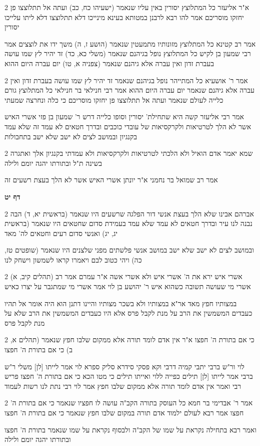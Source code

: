 \documentclass[12pt, openany]{book}
\newcommand{\sethebfont}{
\fontsize{10.5pt}{21.0pt} \selectfont
}
\newcommand{\twocol}[1]{
	{\sethebfont \begin{multicols}{2}
			#1
	\end{multicols}}	
}
\newcommand{\sectname}{}
\newcommand{\newsection}[1]{
	\addcontentsline{toc}{section}{#1}
	\renewcommand{\sectname}{#1}	
	\vspace{-\baselineskip}
	\begin{center}
		\textbf{%
\fontsize{16pt}{16pt}\selectfont
			#1}
	\end{center}
	\vspace{-\baselineskip}
	\nopagebreak
}
\begin{document}
\twocol{א"ר אליעזר כל המתלוצץ יסורין באין עליו שנאמר (ישעיהו כח, כב) ועתה אל תתלוצצו פן יחזקו מוסריכם אמר להו רבא לרבנן במטותא בעינא מינייכו דלא תתלוצצו דלא ליתו עלייכו יסורין
\par אמר רב קטינא כל המתלוצץ מזונותיו מתמעטין שנאמר (הושע ז, ה) משך ידו את לוצצים אמר רבי שמעון בן לקיש כל המתלוצץ נופל בגיהנם שנאמר (משלי כא, כד) זד יהיר לץ שמו עושה בעברת זדון ואין עברה אלא גיהנם שנאמר (צפניה א, טו) יום עברה היום ההוא}
\twocol{אמר ר' אושעיא כל המתייהר נופל בגיהנם שנאמר זד יהיר לץ שמו עושה בעברת זדון ואין עברה אלא גיהנם שנאמר יום עברה היום ההוא אמר רבי חנילאי בר חנילאי כל המתלוצץ גורם כלייה לעולם שנאמר ועתה אל תתלוצצו פן יחזקו מוסריכם כי כלה ונחרצה שמעתי
\par אמר רבי אליעזר קשה היא שתחילת' יסורין וסופו כלייה דרש ר' שמעון בן פזי אשרי האיש אשר לא הלך לטרטיאות ולקרקסיאות של עובדי כוכבים ובדרך חטאים לא עמד זה שלא עמד בקנגיון ובמושב לצים לא ישב שלא ישב בתחבולות}
\twocol{שמא יאמר אדם הואיל ולא הלכתי לטרטיאות ולקרקסיאות ולא עמדתי בקנגיון אלך ואתגרה בשינה ת"ל ובתורתו יהגה יומם ולילה
\par אמר רב שמואל בר נחמני א"ר יונתן אשרי האיש אשר לא הלך בעצת רשעים זה}
\newsection{דף יט}
\twocol{אברהם אבינו שלא הלך בעצת אנשי דור הפלגה שרשעים היו שנאמר (בראשית יא, ד) הבה נבנה לנו עיר ובדרך חטאים לא עמד שלא עמד בעמידת סדום שחטאים היו שנאמר (בראשית יג, יג) ואנשי סדום רעים וחטאים לה' מאד
\par ובמושב לצים לא ישב שלא ישב במושב אנשי פלשתים מפני שלצנים היו שנאמר (שופטים טז, כה) ויהי כטוב לבם ויאמרו קראו לשמשון וישחק לנו}
\twocol{(תהלים קיב, א) אשרי איש ירא את ה' אשרי איש ולא אשרי אשה א"ר עמרם אמר רב אשרי מי שעושה תשובה כשהוא איש ר' יהושע בן לוי אמר אשרי מי שמתגבר על יצרו כאיש
\par במצותיו חפץ מאד אר"א במצותיו ולא בשכר מצותיו והיינו דתנן הוא היה אומר אל תהיו כעבדים המשמשין את הרב על מנת לקבל פרס אלא היו כעבדים המשמשין את הרב שלא על מנת לקבל פרס}
\twocol{כי אם בתורת ה' חפצו א"ר אין אדם לומד תורה אלא ממקום שלבו חפץ שנאמר (תהלים א, ב) כי אם בתורת ה' חפצו
\par לוי ור"ש ברבי יתבי קמיה דרבי וקא פסקי סידרא סליק ספרא לוי אמר לייתו [לן] משלי ר"ש ברבי אמר לייתו [לן] תילים כפייה ללוי ואייתו תילים כי מטו הכא כי אם בתורת ה' חפצו פריש רבי ואמר אין אדם לומד תורה אלא ממקום שלבו חפץ אמר לוי רבי נתת לנו רשות לעמוד}
\twocol{אמר ר' אבדימי בר חמא כל העוסק בתורה הקב"ה עושה לו חפציו שנאמר כי אם בתורת ה' חפצו אמר רבא לעולם ילמוד אדם תורה במקום שלבו חפץ שנאמר כי אם בתורת ה' חפצו
\par ואמר רבא בתחילה נקראת על שמו של הקב"ה ולבסוף נקראת על שמו שנאמר בתורת ה' חפצו ובתורתו יהגה יומם ולילה}
\end{document}
